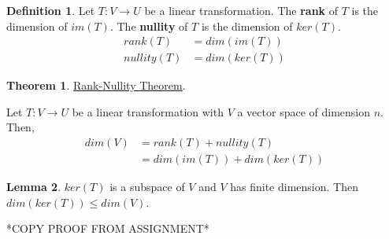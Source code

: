 \documentclass{report}
\theoremstyle{definition}
\newtheorem*{_def}{Definition}
\newtheorem{_thm}{Theorem}[section]
\newtheorem{_lem}[_thm]{Lemma}
\theoremstyle{remark}
\begin{document}
\begin{_def}
Let $T:V\rightarrow U$ be a linear transformation.
The \textbf{rank} of $T$ is the dimension of $im(T)$.
The \textbf{nullity} of $T$ is the dimension of $ker(T)$.
\begin{align*}
 rank(T)&=dim(im(T))\\
 nullity(T)&=dim(ker(T))
\end{align*}
\end{_def}

\begin{_thm}
\underline{Rank-Nullity Theorem}.

Let $T:V\rightarrow U$ be a linear transformation with $V$ a vector space of dimension $n$.
Then,
\begin{align*}
 dim(V)&=rank(T)+nullity(T)\\
 &=dim(im(T))+dim(ker(T))
\end{align*}
\end{_thm}

\begin{_lem}
$ker(T)$ is a subspace of $V$ and $V$ has finite dimension.
Then $dim(ker(T))\leq dim(V)$.

*COPY PROOF FROM ASSIGNMENT*
\end{_lem}
\end{document}
